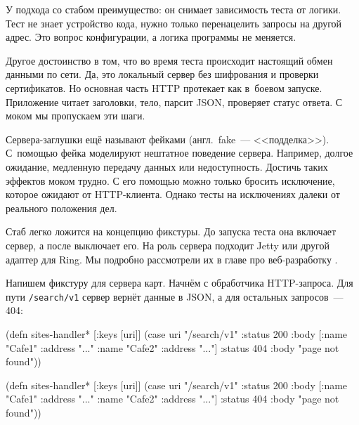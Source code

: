 У подхода со стабом преимущество: он снимает зависимость теста от логики. Тест
не знает устройство кода, нужно только перенацелить запросы на другой адрес. Это
вопрос конфигурации, а логика программы не меняется.

Другое достоинство в том, что во время теста происходит настоящий обмен данными
по сети. Да, это локальный сервер без шифрования и проверки сертификатов. Но
основная часть HTTP протекает как в~боевом запуске. Приложение читает заголовки,
тело, парсит JSON, проверяет статус ответа. С моком мы пропускаем эти шаги.


Сервера-заглушки ещё называют фейками (англ.~fake~--- <<подделка>>). С~помощью
фейка моделируют нештатное поведение сервера. Например, долгое ожидание,
медленную передачу данных или недоступность. Достичь таких эффектов моком
трудно. С его помощью можно только бросить исключение, которое ожидают от
HTTP-клиента. Однако тесты на исключениях далеки от реального положения дел.

Стаб легко ложится на концепцию фикстуры. До запуска теста она включает сервер,
а после выключает его. На роль сервера подходит Jetty или другой адаптер для
Ring. Мы подробно рассмотрели их в главе про веб-разработку .

Напишем фикстуру для сервера карт. Начнём с обработчика HTTP-запроса. Для пути
\verb|/search/v1| сервер вернёт данные в JSON, а для остальных запросов~--- 404:

\label{sites-handler}

\iflarge\vspace{15mm}\pagebreak[4]\fi

\ifnarrow

\begin{english}
  \begin{clojure}
(defn sites-handler* [{:keys [uri]}]
  (case uri
    "/search/v1"
    {:status 200
     :body [{:name "Cafe1"
             :address "..."}
            {:name "Cafe2"
             :address "..."}]}
    {:status 404
     :body "page not found"}))
  \end{clojure}
\end{english}

\else

\begin{english}
  \begin{clojure}
(defn sites-handler* [{:keys [uri]}]
  (case uri
    "/search/v1"
    {:status 200
     :body [{:name "Cafe1" :address "..."}
            {:name "Cafe2" :address "..."}]}
    {:status 404
     :body "page not found"}))
  \end{clojure}
\end{english}

